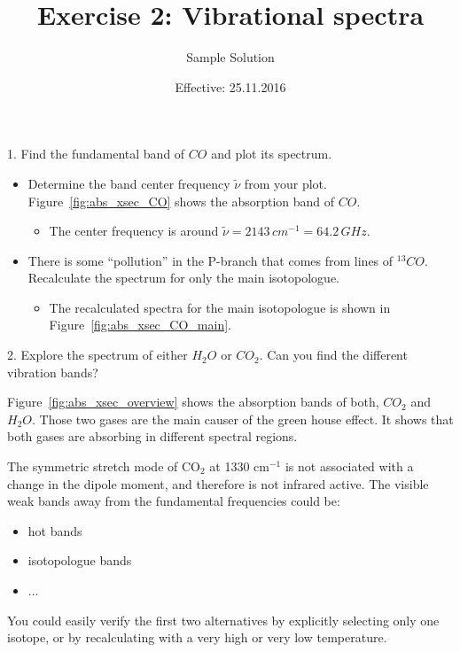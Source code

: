 \documentclass[paper=a4, fontsize=11pt]{scrartcl} %
\title{Exercise 2: Vibrational spectra}
\author{Sample Solution}
\date{Effective: 25.11.2016}
\begin{document}
\maketitle

1. Find the fundamental band of $CO$ and plot its spectrum.
\begin{itemize}
  \item Determine the band center frequency $\tilde{\nu}$ from your plot.
    Figure~\ref{fig:abs_xsec_CO} shows the absorption band of $CO$.
    \begin{itemize}
      \item The center frequency is around $\tilde{\nu} = 2143\,cm^{-1} = 64.2\,GHz$.
    \end{itemize}

  \item There is some “pollution” in the P-branch that comes from lines of $^{13}CO$.
    Recalculate the spectrum for only the main isotopologue.
    \begin{itemize}
      \item The recalculated spectra for the main isotopologue is shown in
        Figure~\ref{fig:abs_xsec_CO_main}.
    \end{itemize}
\end{itemize}

2. Explore the spectrum of either $H_2O$ or $CO_2$. Can you find the different
vibration bands?

Figure~\ref{fig:abs_xsec_overview} shows the absorption bands of both, $CO_2$
and $H_2O$. Those two gases are the main causer of the green house effect. It
shows that both gases are absorbing in different spectral regions.

The symmetric stretch mode of CO$_2$ at 1330 cm$^{-1}$ is not associated with a change
in the dipole moment, and therefore is not infrared active. The
visible weak bands away from the fundamental frequencies could be:
\begin{itemize}
\item hot bands
\item isotopologue bands
\item ...
\end{itemize}
You could easily verify the first two alternatives by explicitly
selecting only one isotope, or by recalculating with a very high or
very low temperature.
\end{document}
